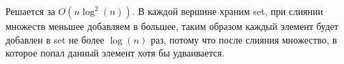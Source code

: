 Решается за $O(n \log^2(n))$. В каждой вершине храним set, при слиянии
множеств меньшее добавляем в большее, таким образом
каждый элемент будет добавлен в set не более $\log(n)$ раз, потому
что после слияния множество, в которое попал данный элемент
хотя бы удваивается.
